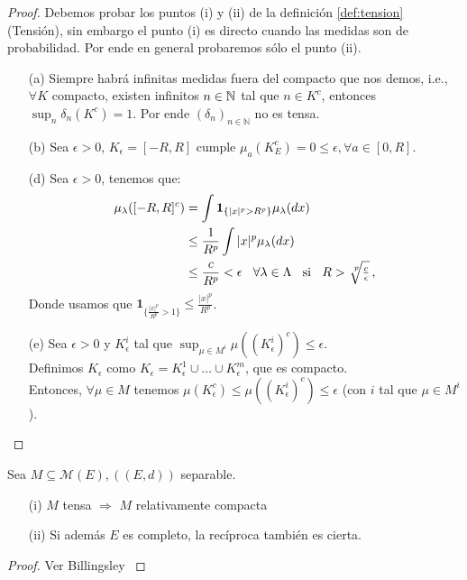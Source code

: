 \begin{proof}
\gris
Debemos probar los puntos (i) y (ii) de la definición \ref{def:tension} (Tensión), sin embargo el punto (i) es directo cuando las medidas son de probabilidad. Por ende en general probaremos sólo el punto (ii).
\begin{enumerate}
    \item[(a)] Siempre habrá infinitas medidas fuera del compacto que nos demos, i.e., $\forall K$ compacto, existen infinitos $n\in\mathbb{N}$ tal que $n\in K^c$, entonces $\displaystyle\sup_n\delta_n(K^c)=1$. Por ende $(\delta_n)_{n\in\mathbb{N}}$ no es tensa.
    \item[(b)] %
    Sea $\epsilon>0$, $K_\epsilon=[-R,R]$ cumple $\mu_a(K_E^c)=0\leq\epsilon, \forall a\in[0,R]$.
    \item[(d)] Sea $\epsilon>0$, tenemos que: %
    \begin{alignat*}{2}
        \mu_\lambda([-R,R]^c) & = \int\mathbf{1}_{\{|x|^p>R^p\}}\mu_\lambda(dx) \\
         & \leq \frac{1}{R^p}\int |x|^p\mu_\lambda(dx)\\
         & \leq \frac{c}{R^p} < \epsilon \espacio \forall \lambda \in \Lambda \espacio \text{si} \espacio R>\sqrt[\leftroot{-3}\uproot{3}p]{\tfrac{c}{\epsilon}}\, , %
    \end{alignat*}
    Donde usamos que $\mathbf{1}_{\{\frac{|x|^p}{R^p}>1\}}\leq\frac{|x|^p}{R^p}$.
    \item[(e)] Sea $\epsilon>0$ y $K_\epsilon^i$ tal que $\displaystyle\sup_{\mu\in M^i}\mu((K^i_\epsilon)^c)\leq\epsilon$.
    \\ Definimos $K_\epsilon$ como $K_\epsilon=K^1_\epsilon\cup\dots\cup K^m_\epsilon$, que es compacto.
    \\ Entonces, $\forall \mu\in M$ tenemos
    $ \mu(K_\epsilon^c)\leq\mu((K^i_\epsilon)^c)\leq\epsilon$ (con $i$ tal que $\mu\in M^i$).
\end{enumerate}
\findem \negro
\end{proof}

\begin{theorem}[Prokhorov]
\label{theorem:pro}
Sea $M\subseteq\mathcal{M}(E), ((E,d))$ separable.
\begin{itemize}
    \item[(i)] $M$ tensa $\Longrightarrow$ $M$ relativamente compacta
    \item[(ii)] Si además $E$ es completo, la recíproca también es cierta.
\end{itemize}
\end{theorem}
\begin{proof}
\gris Ver Billingsley \cite{billing} \negro
\end{proof}

